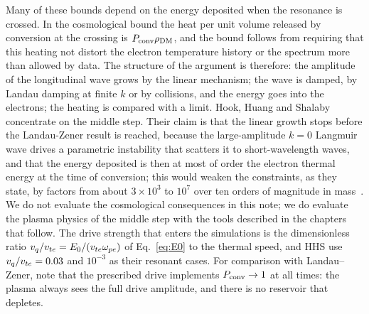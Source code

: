 Many of these bounds depend on the energy deposited when the resonance is crossed. In the cosmological bound the heat per unit volume released by conversion at the crossing is $P_{\rm conv}\rho_{\rm DM}$, and the bound follows from requiring that this heating not distort the electron temperature history or the spectrum more than allowed by data. The structure of the argument is therefore: the amplitude of the longitudinal wave grows by the linear mechanism; the wave is damped, by Landau damping at finite $k$ or by collisions, and the energy goes into the electrons; the heating is compared with a limit. Hook, Huang and Shalaby concentrate on the middle step. Their claim is that the linear growth stops before the Landau-Zener result is reached, because the large-amplitude $k=0$ Langmuir wave drives a parametric instability that scatters it to short-wavelength waves, and that the energy deposited is then at most of order the electron thermal energy at the time of conversion; this would weaken the constraints, as they state, by factors from about $3\times10^3$ to $10^7$ over ten orders of magnitude in mass~\citep{HHS2026}. We do not evaluate the cosmological consequences in this note; we do evaluate the plasma physics of the middle step with the tools described in the chapters that follow. The drive strength that enters the simulations is the dimensionless ratio $v_q/v_{te}=E_0/(v_{te}\omega_{pe})$ of Eq.~\eqref{eq:E0} to the thermal speed, and HHS use $v_q/v_{te}=0.03$ and $10^{-3}$ as their resonant cases. For comparison with Landau--Zener, note that the prescribed drive implements $P_{\rm conv}\to1$ at all times: the plasma always sees the full drive amplitude, and there is no reservoir that depletes.
